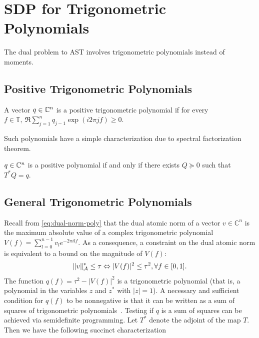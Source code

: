 
\section{SDP for Trigonometric Polynomials} %
\label{sec:sdp_for_trigonometric_polynomials}

The dual problem to AST involves trigonometric polynomials instead of moments.
\subsection{Positive Trigonometric Polynomials}

\begin{definition}
A vector $q \in \mathbb{C}^n$ is a positive trigonometric polynomial if
for every $f \in \mathbb{T},~ \Re\sum_{j=1}^{n} q_{j-1} \exp(i2\pi j f) \geq 0.$
\end{definition}

Such polynomials have a simple characterization due to spectral
factorization theorem.

\begin{theorem}\label{thm:gram-mtx-positive-poly}
$q \in \mathbb{C}^n$ is a positive polynomial if and only if there exists $Q \succeq 0$ such that $T^*Q = q.$
\end{theorem}

\subsection{General Trigonometric Polynomials}

Recall from \eqref{eq:dual-norm-poly} that the dual atomic norm of a vector $v
\in \mathbb{C}^n$ is the maximum absolute value of a complex trigonometric
polynomial $V(f) = \sum_{l=0}^{n-1} v_l e^{-2\pi i l f}$. As a
consequence, a constraint on the dual atomic norm is equivalent to
a bound on the magnitude of $V(f)$:
\begin{align*}
\|v\|_{\mathcal{A}}^* \leq \tau \Leftrightarrow |V(f)|^2 \leq \tau^2, \forall f \in [0, 1].
\end{align*}
The function $q(f) = \tau^2-|V(f)|^2$ is a trigonometric polynomial (that is, a
polynomial in the variables $z$ and $z^*$ with $|z|=1$). A necessary and
sufficient condition for $q(f)$ to be nonnegative is that it can be written as
a sum of squares of trigonometric polynomials~\cite{Megretski03}. 
Testing if $q$ is a sum of squares can be achieved
via semidefinite programming. Let $T^*$ denote the adjoint of the map $T$. Then we have the following
succinct characterization

